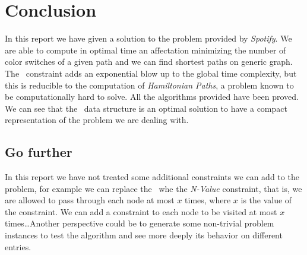 \section{Conclusion}

In this report we have given a solution to the problem provided by \textit{Spotify}. We are able to compute in optimal time an affectation minimizing the number of color switches of a given path and we can find shortest paths on generic graph. The \alldiff\ constraint adds an exponential blow up to the global time complexity, but this is reducible to the computation of \textit{Hamiltonian Paths}, a problem known to be computationally hard to solve. All the algorithms provided have been proved. We can see that the \mdd\ data structure is an optimal solution to have a compact representation of the problem we are dealing with.

\subsection{Go further}

In this report we have not treated some additional constraints we can add to the problem, for example we can replace the \alldiff\ whe the \textit{N-Value} constraint, that is, we are allowed to pass through each node at most $x$ times, where $x$ is the value of the constraint. We can add a constraint to each node to be visited at most $x$ times\dots Another perspective could be to generate some non-trivial problem instances to test the algorithm and see more deeply its behavior on different entries.